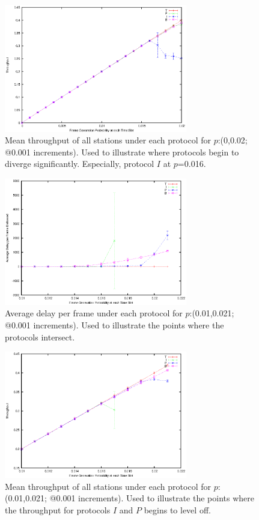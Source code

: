\documentclass[twocolumn]{article}
\begin{document}
\begin{figure}
    \centering \includegraphics[width=8cm]{plots/ib_diverge_throughput.eps}
    \caption{\footnotesize Mean throughput of all stations under each protocol
    for $p$:(0,0.02; @0.001 increments). Used to illustrate where protocols
    begin to diverge significantly. Especially, protocol $I$ at $p$=0.016.}
    \label{fig:throughput_ib}
\end{figure}

\begin{figure}
    \centering \includegraphics[width=8cm]{plots/tpbi_delay.eps}
    \caption{\footnotesize Average delay per frame under each protocol for
    $p$:(0.01,0.021; @0.001 increments). Used to illustrate the points where the
    protocols intersect.} \label{fig:delay_diverging}
\end{figure}

\begin{figure}
    \centering \includegraphics[width=8cm]{plots/tpbi_throughput.eps}
    \caption{\footnotesize Mean throughput of all stations under each protocol
    for $p$:(0.01,0.021; @0.001 increments). Used to illustrate the points where
    the throughput for protocols $I$ and $P$ begins to level off.}
    \label{fig:throughput_diverging}
\end{figure}
\end{document}
